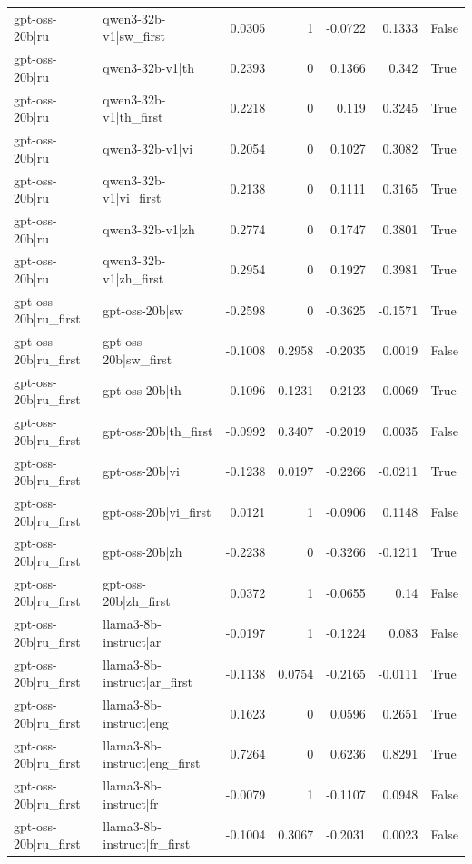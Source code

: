 \begin{table}
\begin{tabular}{l l r r r r l}
gpt-oss-20b|ru & qwen3-32b-v1|sw_first & 0.0305 & 1 & -0.0722 & 0.1333 & False \\
gpt-oss-20b|ru & qwen3-32b-v1|th & 0.2393 & 0 & 0.1366 & 0.342 & True \\
gpt-oss-20b|ru & qwen3-32b-v1|th_first & 0.2218 & 0 & 0.119 & 0.3245 & True \\
gpt-oss-20b|ru & qwen3-32b-v1|vi & 0.2054 & 0 & 0.1027 & 0.3082 & True \\
gpt-oss-20b|ru & qwen3-32b-v1|vi_first & 0.2138 & 0 & 0.1111 & 0.3165 & True \\
gpt-oss-20b|ru & qwen3-32b-v1|zh & 0.2774 & 0 & 0.1747 & 0.3801 & True \\
gpt-oss-20b|ru & qwen3-32b-v1|zh_first & 0.2954 & 0 & 0.1927 & 0.3981 & True \\
gpt-oss-20b|ru_first & gpt-oss-20b|sw & -0.2598 & 0 & -0.3625 & -0.1571 & True \\
gpt-oss-20b|ru_first & gpt-oss-20b|sw_first & -0.1008 & 0.2958 & -0.2035 & 0.0019 & False \\
gpt-oss-20b|ru_first & gpt-oss-20b|th & -0.1096 & 0.1231 & -0.2123 & -0.0069 & True \\
gpt-oss-20b|ru_first & gpt-oss-20b|th_first & -0.0992 & 0.3407 & -0.2019 & 0.0035 & False \\
gpt-oss-20b|ru_first & gpt-oss-20b|vi & -0.1238 & 0.0197 & -0.2266 & -0.0211 & True \\
gpt-oss-20b|ru_first & gpt-oss-20b|vi_first & 0.0121 & 1 & -0.0906 & 0.1148 & False \\
gpt-oss-20b|ru_first & gpt-oss-20b|zh & -0.2238 & 0 & -0.3266 & -0.1211 & True \\
gpt-oss-20b|ru_first & gpt-oss-20b|zh_first & 0.0372 & 1 & -0.0655 & 0.14 & False \\
gpt-oss-20b|ru_first & llama3-8b-instruct|ar & -0.0197 & 1 & -0.1224 & 0.083 & False \\
gpt-oss-20b|ru_first & llama3-8b-instruct|ar_first & -0.1138 & 0.0754 & -0.2165 & -0.0111 & True \\
gpt-oss-20b|ru_first & llama3-8b-instruct|eng & 0.1623 & 0 & 0.0596 & 0.2651 & True \\
gpt-oss-20b|ru_first & llama3-8b-instruct|eng_first & 0.7264 & 0 & 0.6236 & 0.8291 & True \\
gpt-oss-20b|ru_first & llama3-8b-instruct|fr & -0.0079 & 1 & -0.1107 & 0.0948 & False \\
gpt-oss-20b|ru_first & llama3-8b-instruct|fr_first & -0.1004 & 0.3067 & -0.2031 & 0.0023 & False \\

\end{tabular}
\end{table}
